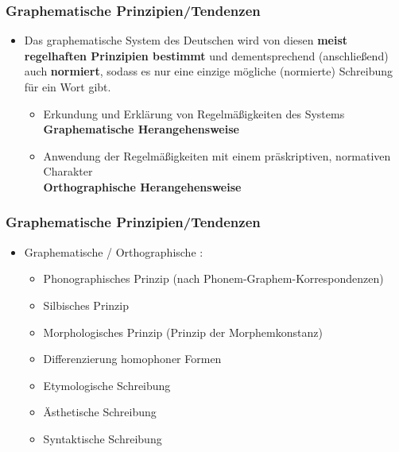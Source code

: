 \begin{frame}
\frametitle{Graphematische Prinzipien/Tendenzen}

\begin{itemize}
	\item Das graphematische System des Deutschen wird von diesen
	\textbf{meist regelhaften Prinzipien bestimmt} und dementsprechend
	(anschließend) auch \textbf{normiert}, sodass es nur eine einzige
	mögliche (normierte) Schreibung für ein Wort gibt.
	
	\begin{itemize}
		\item Erkundung und Erklärung von Regelmäßigkeiten des Systems \\
		\ras \textbf{Graphematische Herangehensweise}
		
		\item Anwendung der Regelmäßigkeiten mit einem präskriptiven,
		normativen Charakter \\
		\ras \textbf{Orthographische Herangehensweise}
	\end{itemize}
\end{itemize}

\end{frame}


\begin{frame}
\frametitle{Graphematische Prinzipien/Tendenzen}

\begin{itemize}
	\item Graphematische / Orthographische :
	
	\begin{itemize}
		\item Phonographisches Prinzip (nach Phonem-Graphem-Korrespondenzen)

		\item Silbisches Prinzip

		\item Morphologisches Prinzip (Prinzip der Morphemkonstanz)

		\item Differenzierung homophoner Formen

		\item Etymologische Schreibung

		\item Ästhetische Schreibung

		\item Syntaktische Schreibung
	\end{itemize}
\end{itemize}


\end{frame}


